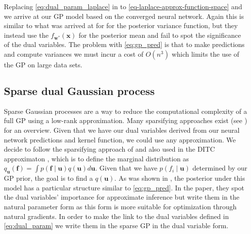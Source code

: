 \documentclass{article}
\newcommand{\mbf}[1]{\mathbf{#1}}
\newcommand{\vf}{\mbf{f}}
\newcommand{\vu}{\mbf{u}}
\newcommand{\vx}{\mbf{x}}
\newcommand{\vw}{\mbf{w}}
\begin{document}
Replacing \cref{eq:dual_param_laplace} in to \cref{eq-laplace-approx-function-space} and we arrive at our GP model based on the converged neural network. Again this is similar to what was arrived at for \citet{immerImprovingPredictionsBayesian2021} for the posterior variance function, but they instead use the $f_{\vw^*}(\vx)$ for the posterior mean and fail to spot the significance of the dual variables. The problem with \cref{eq:gp_pred} is that to make predictions and compute variances we must incur a cost of $O(n^3)$ which limits the use of the GP on large data sets.


\subsection{Sparse dual Gaussian process} 
\label{sec:sparse-dual-gp}
%
Sparse Gaussian processes are a way to reduce the computational complexity of a full GP using a low-rank approximation. Many sparsifying approaches exist (see \cite{quinonero2005unifying}) for an overview. Given that we have our dual variables derived from our neural network predictions and kernel function, we could use any approximation. We decide to follow the sparsifying approach of \citet{titsias2009variational} and also used in the DITC approximaton \cite{quinonero2005unifying}, which is to define the marginal distribution as $q_{\vu}(\vf)  = \int p(\vf  \mid \vu) q(\vu)  d\vu$. Given that we have $p(f_i  \mid \vu)$ determined by our GP prior, the goal is to find a $q(\vu)$. As was shown in \cite{adam2021dual}, the posterior under this model has a particular structure similar to \cref{eq:gp_pred}. In the paper, they spot the dual variables' importance for approximate inference but write them in the natural parameter form as this form is more suitable for optimization through natural gradients. In order to make the link to the dual variables defined in \cref{eq:dual_param} we write them in the sparse GP in the dual variable form. 
\end{document}
